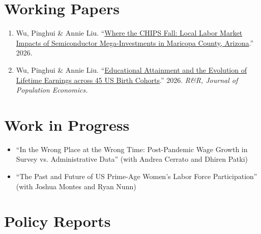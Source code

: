 \documentclass[11pt,letterpaper]{article}
\begin{document}
\section*{Working Papers}

\begin{enumerate}[leftmargin=15pt, itemsep=6pt, parsep=0pt]
    \item Wu, Pinghui \& Annie Liu. ``\href{papers/Wu_Liu_2026_semiconductor_investment_and_local_labor_market.pdf}{Where the CHIPS Fall: Local Labor Market Impacts of Semiconductor Mega-Investments in Maricopa County, Arizona}.'' 2026.

    \item Wu, Pinghui \& Annie Liu. ``\href{papers/Wu_Liu_2026_Education_and_Lifetime_Earnings.pdf}{Educational Attainment and the Evolution of Lifetime Earnings across 45 US Birth Cohorts}.'' 2026. \textit{R\&R, Journal of Population Economics.}
\end{enumerate}

\section*{Work in Progress}

\begin{itemize}[leftmargin=15pt, itemsep=4pt, parsep=0pt]
    \item ``In the Wrong Place at the Wrong Time: Post-Pandemic Wage Growth in Survey vs. Administrative Data'' (with Andrea Cerrato and Dhiren Patki)

    \item ``The Past and Future of US Prime-Age Women's Labor Force Participation'' (with Joshua Montes and Ryan Nunn)
\end{itemize}

\section*{Policy Reports}
\end{document}
